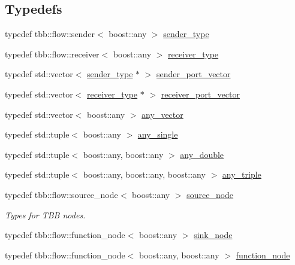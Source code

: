 \subsection*{Typedefs}
\begin{DoxyCompactItemize}
\item 
typedef tbb\+::flow\+::sender$<$ boost\+::any $>$ \hyperlink{namespace_wire_cell_tbb_a6d03ef9befd6914b5cf734e3ebf4fc68}{sender\+\_\+type}
\item 
typedef tbb\+::flow\+::receiver$<$ boost\+::any $>$ \hyperlink{namespace_wire_cell_tbb_ae1d3e39f466e5c2d3d5198cab827f73f}{receiver\+\_\+type}
\item 
typedef std\+::vector$<$ \hyperlink{namespace_wire_cell_tbb_a6d03ef9befd6914b5cf734e3ebf4fc68}{sender\+\_\+type} $\ast$ $>$ \hyperlink{namespace_wire_cell_tbb_a99272fef0f0c33dc9d4e6e8f777b2e6e}{sender\+\_\+port\+\_\+vector}
\item 
typedef std\+::vector$<$ \hyperlink{namespace_wire_cell_tbb_ae1d3e39f466e5c2d3d5198cab827f73f}{receiver\+\_\+type} $\ast$ $>$ \hyperlink{namespace_wire_cell_tbb_a87f42fe8a3ccc3bf9d315cb2d252c7af}{receiver\+\_\+port\+\_\+vector}
\item 
typedef std\+::vector$<$ boost\+::any $>$ \hyperlink{namespace_wire_cell_tbb_a5da2a89721f83af1aff5d0ce11ed8c44}{any\+\_\+vector}
\item 
typedef std\+::tuple$<$ boost\+::any $>$ \hyperlink{namespace_wire_cell_tbb_add86809a147ec9695fadae148a7059ea}{any\+\_\+single}
\item 
typedef std\+::tuple$<$ boost\+::any, boost\+::any $>$ \hyperlink{namespace_wire_cell_tbb_a5ebba472c9f7492c293d2705740ea148}{any\+\_\+double}
\item 
typedef std\+::tuple$<$ boost\+::any, boost\+::any, boost\+::any $>$ \hyperlink{namespace_wire_cell_tbb_a7fd069c2369fd99a53829ff09b7a32b6}{any\+\_\+triple}
\item 
typedef tbb\+::flow\+::source\+\_\+node$<$ boost\+::any $>$ \hyperlink{namespace_wire_cell_tbb_a5f0d1bf6be0fa850153848d32d3e6f1e}{source\+\_\+node}
\begin{DoxyCompactList}\small\item\em Types for T\+BB nodes. \end{DoxyCompactList}\item 
typedef tbb\+::flow\+::function\+\_\+node$<$ boost\+::any $>$ \hyperlink{namespace_wire_cell_tbb_a00d199e066569f374f4baee329bf802c}{sink\+\_\+node}
\item 
typedef tbb\+::flow\+::function\+\_\+node$<$ boost\+::any, boost\+::any $>$ \hyperlink{namespace_wire_cell_tbb_a61220b5d8f4185012c87d8bd7eb02909}{function\+\_\+node}

\end{DoxyCompactItemize}
